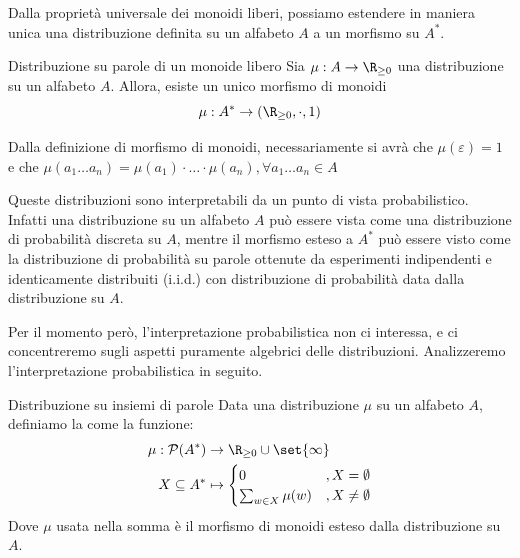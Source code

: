 Dalla proprietà universale dei monoidi liberi, possiamo estendere in maniera unica una distribuzione definita su un alfabeto \(A\) a un morfismo su \(A^*\).
\begin{definition}{Distribuzione su parole di un monoide libero}
  Sia \(\mu: A \to \R_{\geq 0}\) una distribuzione su un alfabeto \(A\).
  Allora, esiste un unico morfismo di monoidi
    \[\mu: A^* \to (\R_{\geq 0}, \cdot, 1)\]
\end{definition}

Dalla definizione di morfismo di monoidi, necessariamente si avrà che \(\mu(\varepsilon) = 1\) e che \(\mu(a_1\ldots a_n) = \mu(a_1)\cdot\ldots\cdot \mu(a_n), \forall a_1\ldots a_n \in A\)

\begin{note}{}
  Queste distribuzioni sono interpretabili da un punto di vista probabilistico.
  Infatti una distribuzione su un alfabeto \(A\) può essere vista come una distribuzione di probabilità discreta su \(A\),
  mentre il morfismo esteso a \(A^*\) può essere visto come la distribuzione di probabilità su parole ottenute da esperimenti indipendenti e identicamente distribuiti (i.i.d.) con distribuzione di probabilità data dalla distribuzione su \(A\).
  
  Per il momento però, l'interpretazione probabilistica non ci interessa, e ci concentreremo sugli aspetti puramente algebrici delle distribuzioni.
  Analizzeremo l'interpretazione probabilistica in seguito.
\end{note}

\begin{definition}{Distribuzione su insiemi di parole}
  Data una distribuzione \(\mu\) su un alfabeto \(A\), definiamo la  come la funzione:
  \begin{equation*}
    \begin{aligned}
      \mu: \mathcal{P}(A^*) &\to \R_{\geq 0} \cup \set{\infty} \\
                  X \subseteq A^* &\mapsto \begin{cases}
                      0 & ,X = \emptyset \\
                      \sum_{w \in X} \mu(w) & ,X \neq \emptyset
                    \end{cases}
    \end{aligned}
  \end{equation*}
  Dove \(\mu\) usata nella somma è il morfismo di monoidi esteso dalla distribuzione su \(A\).  
\end{definition}

